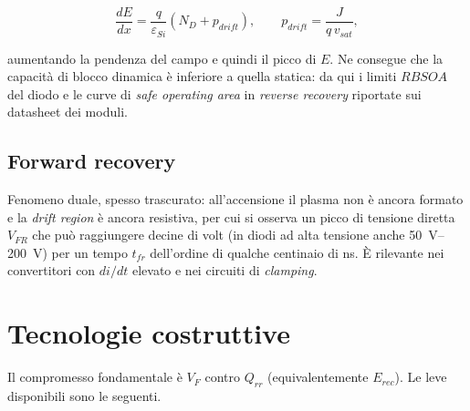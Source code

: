 \documentclass[11pt,a4paper]{article}
\begin{document}
\begin{equation}
\frac{dE}{dx} = \frac{q}{\varepsilon_{Si}}\left(N_D + p_{drift}\right),
\qquad p_{drift} = \frac{J}{q\, v_{sat}} ,
\end{equation}

aumentando la pendenza del campo e quindi il picco di $E$. Ne consegue che la
capacità di blocco dinamica è inferiore a quella statica: da qui i limiti
$RBSOA$ del diodo e le curve di \emph{safe operating area} in
\emph{reverse recovery} riportate sui datasheet dei moduli.

\subsection{Forward recovery}

Fenomeno duale, spesso trascurato: all'accensione il plasma non è ancora
formato e la \emph{drift region} è ancora resistiva, per cui si osserva un picco
di tensione diretta $V_{FR}$ che può raggiungere decine di volt (in diodi ad
alta tensione anche \SIrange{50}{200}{\volt}) per un tempo $t_{fr}$ dell'ordine
di qualche centinaio di \si{\nano\second}. È rilevante nei convertitori con
$di/dt$ elevato e nei circuiti di \emph{clamping}.

\section{Tecnologie costruttive}

Il compromesso fondamentale è $V_F$ contro $Q_{rr}$ (equivalentemente
$E_{rec}$). Le leve disponibili sono le seguenti.
\end{document}
